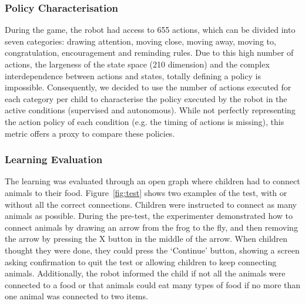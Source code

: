 \subsubsection{Policy Characterisation}

During the game, the robot had access to 655 actions, which can be divided into seven categories: drawing attention, moving close, moving away, moving to, congratulation, encouragement and reminding rules. Due to this high number of actions, the largeness of the state space (210 dimension) and the complex interdependence between actions and states, totally defining a policy is impossible. Consequently, we decided to use the number of actions executed for each category per child to characterise the policy executed by the robot in the active conditions (supervised and autonomous). While not perfectly representing the action policy of each condition (e.g. the timing of actions is missing), this metric offers a proxy to compare these policies. 

\subsubsection{Learning Evaluation}
The learning was evaluated through an open graph where children had to connect animals to their food. Figure~\ref{fig:test} shows two examples of the test, with or without all the correct connections. Children were instructed to connect as many animals as possible. During the pre-test, the experimenter demonstrated how to connect animals by drawing an arrow from the frog to the fly, and then removing the arrow by pressing the X button in the middle of the arrow. When children thought they were done, they could press the `Continue' button, showing a screen asking confirmation to quit the test or allowing children to keep connecting animals. Additionally, the robot informed the child if not all the animals were connected to a food or that animals could eat many types of food if no more than one animal was connected to two items. 

